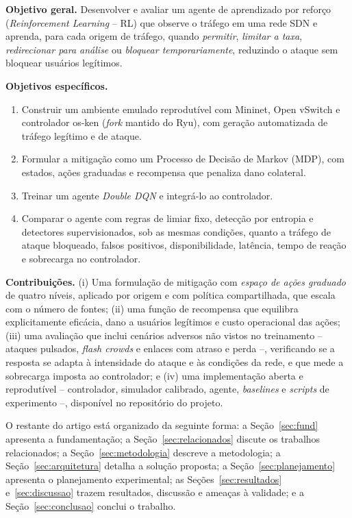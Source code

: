 \documentclass[12pt]{article}
\begin{document}
\textbf{Objetivo geral.} Desenvolver e avaliar um agente de aprendizado por
reforço (\textit{Reinforcement Learning} -- RL) que observe o tráfego em uma
rede SDN e aprenda, para cada origem de tráfego, quando \emph{permitir},
\emph{limitar a taxa}, \emph{redirecionar para análise} ou \emph{bloquear
temporariamente}, reduzindo o ataque sem bloquear usuários legítimos.

\textbf{Objetivos específicos.}
\begin{enumerate}
  \item Construir um ambiente emulado reprodutível com Mininet, Open vSwitch e
        controlador os-ken (\textit{fork} mantido do Ryu), com geração
        automatizada de tráfego legítimo e de ataque.
  \item Formular a mitigação como um Processo de Decisão de Markov (MDP), com
        estados, ações graduadas e recompensa que penaliza dano colateral.
  \item Treinar um agente \textit{Double DQN} e integrá-lo ao controlador.
  \item Comparar o agente com regras de limiar fixo, detecção por entropia e
        detectores supervisionados, sob as mesmas condições, quanto a tráfego de ataque
        bloqueado, falsos positivos, disponibilidade, latência, tempo de
        reação e sobrecarga no controlador.
\end{enumerate}

\textbf{Contribuições.} (i) Uma formulação de mitigação com
\emph{espaço de ações graduado} de quatro níveis, aplicado por origem e com
política compartilhada, que escala com o número de fontes; (ii) uma função de
recompensa que equilibra explicitamente eficácia, dano a usuários legítimos e
custo operacional das ações; (iii) uma avaliação que inclui cenários adversos
não vistos no treinamento -- ataques pulsados, \textit{flash crowds} e enlaces
com atraso e perda --, verificando se a resposta se adapta à intensidade do
ataque e às condições da rede, e que mede a sobrecarga imposta ao controlador;
e (iv) uma implementação aberta e reprodutível -- controlador, simulador
calibrado, agente, \textit{baselines} e \textit{scripts} de experimento --,
disponível no repositório do projeto.

O restante do artigo está organizado da seguinte forma: a
Seção~\ref{sec:fund} apresenta a fundamentação; a Seção~\ref{sec:relacionados}
discute os trabalhos relacionados; a Seção~\ref{sec:metodologia} descreve a
metodologia; a Seção~\ref{sec:arquitetura} detalha a solução proposta; a
Seção~\ref{sec:planejamento} apresenta o planejamento experimental; as
Seções~\ref{sec:resultados} e~\ref{sec:discussao} trazem resultados, discussão e
ameaças à validade; e a Seção~\ref{sec:conclusao} conclui o trabalho.
\end{document}
